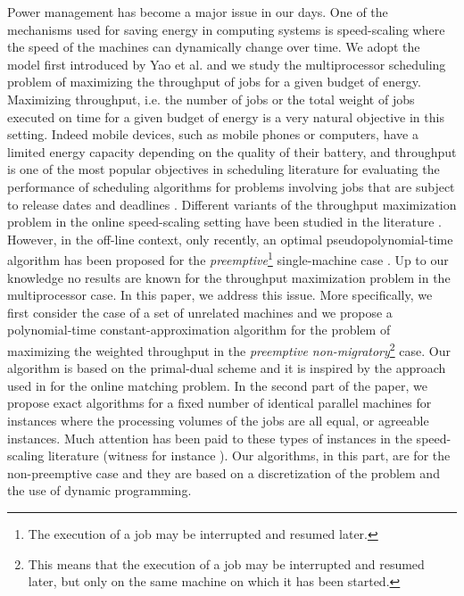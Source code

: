 \documentclass[11pt,a4paper]{article}
\begin{document}
Power management has become a major issue in our days. One of the mechanisms  used for saving energy in computing systems is speed-scaling where the speed of the machines can dynamically change over time. We adopt the model first introduced by 
Yao et al. \cite{YDS95} and we study the multiprocessor scheduling problem of maximizing the throughput of jobs for a given budget of energy. 
Maximizing throughput, i.e. the number of jobs or the total weight of jobs executed on time for a given budget of energy is a very natural objective in this setting. Indeed mobile devices, such as mobile phones or computers, have a limited energy capacity depending on the quality of their battery, and throughput is one of the most popular objectives in scheduling literature for evaluating the performance of scheduling algorithms for problems involving jobs that are subject to release dates and deadlines \cite{Brucker:2010:SA:1951614, Lawler90, DBLP:journals/orl/Baptiste99}. Different variants of the throughput maximization problem in the online speed-scaling setting have been
studied in the literature \cite{CCLLMW07,Li11,BCLL08,CLL10}. However, in the off-line context, only recently, an optimal pseudopolynomial-time algorithm has been proposed for the {\em preemptive}\footnote{The execution of a job may be interrupted and resumed later.} single-machine case \cite{ABC14}. Up to our knowledge no results are known for the throughput maximization problem in the multiprocessor case. In this paper, we address this issue. More specifically, we first consider the case of a set of unrelated machines and we propose a polynomial-time constant-approximation algorithm for the problem of maximizing the weighted throughput in the {\em preemptive non-migratory}\footnote{This means that the execution of a job may be interrupted and resumed later, but only on the same machine on which it has been started.} case. Our algorithm is based on the primal-dual scheme and it is inspired by the approach used in \cite{DevanurJain12:Online-matching} for the online matching problem. In the second part of the paper, we propose exact algorithms for a fixed number of identical parallel machines for instances where the  processing volumes of the jobs are all equal, or agreeable instances. Much attention has been paid to these types of instances in the speed-scaling literature (witness for instance \cite{DBLP:conf/spaa/AlbersMS07}). Our algorithms, in this part, are for the non-preemptive case and they are based on a discretization of the problem and the use of dynamic programming. 
\end{document}
